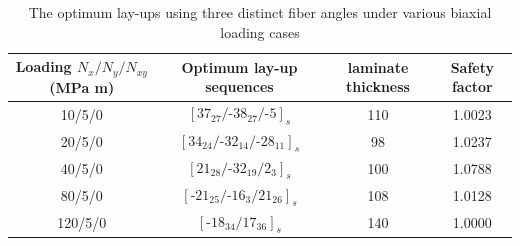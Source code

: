 \begin{table}
\caption{The optimum lay-ups using three distinct fiber angles under various biaxial loading cases}
\label{T300/5308 material properties}
\centering
\begin{tabular}{cccc}
	\toprule
	Loading	$N_{x}/N_{y}/N_{xy}$ (MPa m)	       & Optimum lay-up sequences                                   & laminate thickness &  Safety factor \\
	\midrule
	10/5/0                                         &  $[37_{27}/\text{-}38_{27}/\text{-}5]_s$                   &     110               &  1.0023 \\
	20/5/0                                         &  $[34_{24}/\text{-}32_{14}/\text{-}28_{11}]_s$             &     98               &  1.0237 \\
	40/5/0                                         &  $[21_{28}/\text{-}32_{19}/2_3]_s$                         &     100               &  1.0788 \\
	80/5/0                                         &  $[\text{-}21_{25}/\text{-}16_{3}/21_{26}]_s$              &     108               &  1.0128 \\
	120/5/0                                         &  $[\text{-}18_{34}/17_{36}]_s$                            &     140               &  1.0000 \\
	\bottomrule
\end{tabular}
\end{table}


